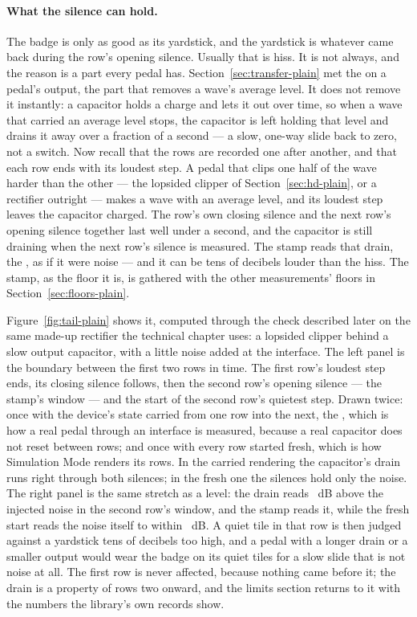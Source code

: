 \documentclass[11pt,a4paper]{article}
\begin{document}
\paragraph{What the silence can hold.} The badge is only as good as its
yardstick, and the yardstick is whatever came back during the row's
opening silence. Usually that is hiss. It is not always, and the reason
is a part every pedal has. Section~\ref{sec:transfer-plain} met the
 on a pedal's output, the part that removes a
wave's average level. It does not remove it instantly: a capacitor holds
a charge and lets it out over time, so when a wave that carried an
average level stops, the capacitor is left holding that level and drains
it away over a fraction of a second --- a slow, one-way slide back to
zero, not a switch. Now recall that the rows are recorded one after
another, and that each row ends with its loudest step. A pedal that
clips one half of the wave harder than the other --- the lopsided clipper
of Section~\ref{sec:hd-plain}, or a rectifier outright --- makes a wave
with an average level, and its loudest step leaves the capacitor
charged. The row's own closing silence and the next row's opening
silence together last well under a second, and the capacitor is still
draining when the next row's silence is measured. The stamp reads that
drain, the , as if it were noise --- and it can be tens of
decibels louder than the hiss. The stamp, as the floor it is, is gathered
with the other measurements' floors in Section~\ref{sec:floors-plain}.

Figure~\ref{fig:tail-plain} shows it, computed through the check
described later on the same made-up rectifier the technical chapter
uses: a lopsided clipper behind a slow output capacitor, with a little
noise added at the interface. The left panel is the boundary between the
first two rows in time. The first row's loudest step ends, its closing
silence follows, then the second row's opening silence --- the stamp's
window --- and the start of the second row's quietest step. Drawn twice:
once with the device's state carried from one row into the next, the
, which is how a real pedal through an interface is
measured, because a real capacitor does not reset between rows; and once
with every row started fresh, which is how Simulation Mode renders its
rows. In the carried rendering the capacitor's drain runs right through
both silences; in the fresh one the silences hold only the noise. The
right panel is the same stretch as a level: the drain reads
\mparityTailHalfCarriedExcess{}~dB above the injected noise in the second
row's window, and the stamp reads it, while the fresh start reads the
noise itself to within \mparityTailHalfIndependentExcess{}~dB. A quiet
tile in that row is then judged against a yardstick tens of decibels too
high, and a pedal with a longer drain or a smaller output would wear the
badge on its quiet tiles for a slow slide that is not noise at all. The
first row is never affected, because nothing came before it; the drain
is a property of rows two onward, and the limits section returns to it
with the numbers the library's own records show.
\end{document}
